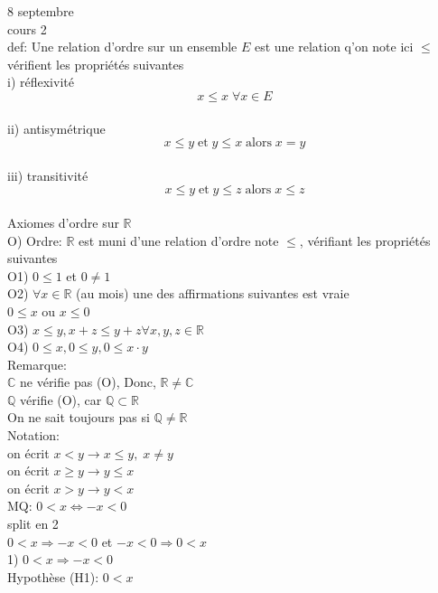 \documentclass{article}
\newcommand{\reals}{\mathbb{R}}
\newcommand{\rationals}{\mathbb{Q}}
\begin{document}
8 septembre\\
cours 2\\

def: Une relation d'ordre sur un ensemble $E$ est une relation q'on note ici $\le$ vérifient les propriétés suivantes\\
i) réflexivité\\
$$ x \le x \; \forall x \in E$$ \\
ii) antisymétrique \\
$$ x \le y \; \text{et} \; y \le x \; \text{alors} \; x = y$$ \\
iii) transitivité\\
$$ x \le y \; \text{et} \; y \le z \; \text{alors} \; x \le z$$ \\

Axiomes d'ordre sur $\reals$ \\

O) Ordre: $\reals$ est muni d'une relation d'ordre note $\le$, vérifiant les propriétés suivantes \\
O1) $0 \le 1$ et $0 \ne 1$\\
O2) $\forall x \in \reals$ (au mois) une des affirmations suivantes est vraie\\
$0 \le x$ ou $x \le 0$ \\
O3) $x \le y, x + z \le y + z \forall x,y,z \in \reals$ \\
O4) $0 \le x, 0 \le y, 0 \le x \cdot y$ \\

Remarque:\\
$\mathbb{C}$ ne vérifie pas (O), Donc, $\reals \ne \mathbb{C}$ \\
$\rationals$ vérifie (O), car $\rationals \subset \reals$\\
On ne sait toujours pas si $\rationals \ne \reals$\\

Notation:\\
on écrit $x < y \rightarrow x \le y, \; x \ne y$\\
on écrit $x \ge y \rightarrow y \le x$\\
on écrit $x > y \rightarrow y < x$\\

MQ: $0 < x \Longleftrightarrow - x < 0$ \\
split en 2 \\
$0 < x \Longrightarrow - x < 0$ et $-x < 0 \Longrightarrow 0 < x$ \\

1) $0 < x \Longrightarrow - x < 0$ \\
Hypothèse (H1): $0 < x$
\end{document}
